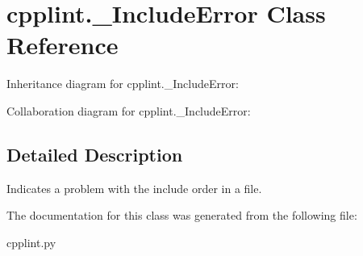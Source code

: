 \hypertarget{classcpplint_1_1__IncludeError}{}\section{cpplint.\+\_\+\+Include\+Error Class Reference}
\label{classcpplint_1_1__IncludeError}


Inheritance diagram for cpplint.\+\_\+\+Include\+Error\+:


Collaboration diagram for cpplint.\+\_\+\+Include\+Error\+:


\subsection{Detailed Description}
\begin{DoxyVerb}Indicates a problem with the include order in a file.\end{DoxyVerb}
 

The documentation for this class was generated from the following file\+:\begin{DoxyCompactItemize}
\item 
cpplint.\+py\end{DoxyCompactItemize}
